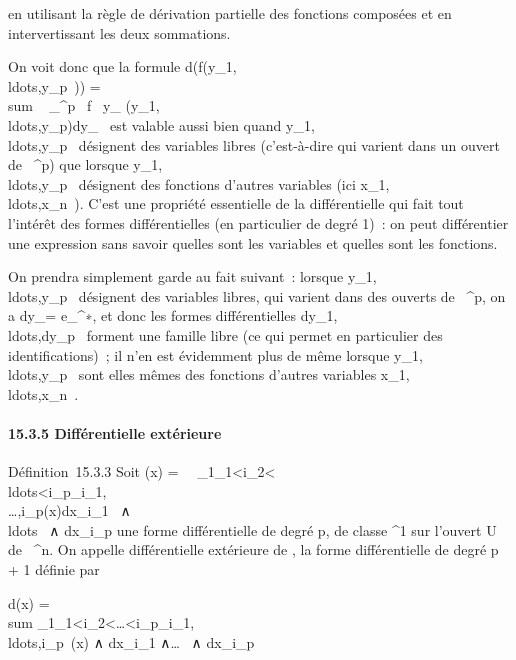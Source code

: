 \documentclass[]{article}
\begin{document}
en utilisant la règle de dérivation partielle des fonctions composées et
en intervertissant les deux sommations.

On voit donc que la formule
d(f(y\_1,\\ldots,y\_p~))
= \\sum ~
\_^p \partial~f \over \partial~y\_\jmath
(y\_1,\\ldots,y\_p)dy\_\jmath~
est valable aussi bien quand
y\_1,\\ldots,y\_p~
désignent des variables libres (c'est-à-dire qui varient dans un ouvert
de ~^p) que lorsque
y\_1,\\ldots,y\_p~
désignent des fonctions d'autres variables (ici
x\_1,\\ldots,x\_n~).
C'est une propriété essentielle de la différentielle qui fait tout
l'intérêt des formes différentielles (en particulier de degré 1)~: on
peut différentier une expression sans savoir quelles sont les variables
et quelles sont les fonctions.

On prendra simplement garde au fait suivant~: lorsque
y\_1,\\ldots,y\_p~
désignent des variables libres, qui varient dans des ouverts de
~^p, on a dy\_\jmath = e\_\jmath^∗, et donc les
formes différentielles
dy\_1,\\ldots,dy\_p~
forment une famille libre (ce qui permet en particulier des
identifications)~; il n'en est évidemment plus de même lorsque
y\_1,\\ldots,y\_p~
sont elles mêmes des fonctions d'autres variables
x\_1,\\ldots,x\_n~.

\paragraph{15.3.5 Différentielle extérieure}

Définition~15.3.3 Soit \omega(x) =\
\sum ~
\_1\leqi\_1\textless{}i\_2\textless{}\\ldots\textless{}i\_p\leqna\_i\_1,\\\ldots,i\_p(x)dx\_i\_1~
∧\\ldots~ ∧
dx\_i\_p une forme différentielle de degré p, de classe
^1 sur l'ouvert U de ~^n. On appelle
différentielle extérieure de \omega, la forme différentielle de degré p + 1
définie par

d\omega(x) = \\sum
\_1\leqi\_1\textless{}i\_2\textless{}\ldots\textless{}i\_p\leqnda\_i\_1,\\ldots,i\_p~(x)
∧ dx\_i\_1 ∧\ldots~ ∧
dx\_i\_p
\end{document}

